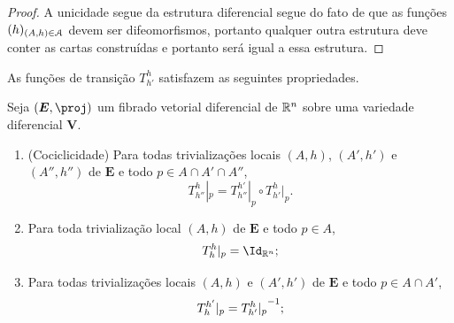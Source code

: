 \begin{proof}
A unicidade segue da estrutura diferencial segue do fato de que as funções $(h)_{(A,h) \in \mathcal{A}}$ devem ser difeomorfismos, portanto qualquer outra estrutura deve conter as cartas construídas e portanto será igual a essa estrutura.
\end{proof}

As funções de transição $T^h_{h'}$ satisfazem as seguintes propriedades.

\begin{prop}
\label{topo:prop.func.trans}
Seja $(\bm E,\proj)$ um fibrado vetorial diferencial de $\mathbb{R}^n$ sobre uma variedade diferencial $\bm V$.
	\begin{enumerate}
%
	\item (Cociclicidade) Para todas trivializações locais $(A,h)$, $(A',h')$ e $(A'',h'')$ de $\bm E$ e todo $p \in A \cap A' \cap A''$,
		\begin{equation*}
		T^h_{h''}|_p = T^{h'}_{h''}|_p \circ T^h_{h'}|_p.
		\end{equation*}

	\item Para toda trivialização local $(A,h)$ de $\bm E$ e todo $p \in A$,
		\begin{equation*}
		T^h_h|_p = \Id_{\R^n};
		\end{equation*}
	
	\item Para todas trivializações locais $(A,h)$ e $(A',h')$ de $\bm E$ e todo $p \in A \cap A'$,
		\begin{equation*}
		T^{h'}_h|_p = {T^h_{h'}|_p}^{-1};
		\end{equation*}
	\end{enumerate}
\end{prop}
